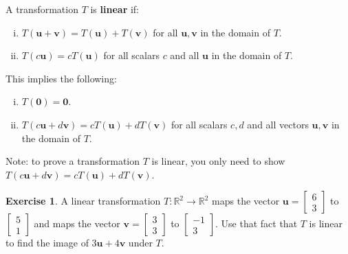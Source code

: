 \documentclass[10pt]{book}
\newcommand{\boxcolor}{gray!30}
\newenvironment{boxme}{\begin{mdframed}[backgroundcolor=\boxcolor,linewidth=0pt,nobreak=true]}{\end{mdframed}}
\theoremstyle{definition}
\newtheorem{exercise}{Exercise}[section]
\newcommand{\R}{\mathbb{R}}
\newcommand{\vect}[1]{\ensuremath{\boldsymbol{\mathbf{#1}}}}
\begin{document}
\newpage


\begin{boxme}
	A transformation $T$ is \textbf{linear} if:
	\begin{enumerate}[(i)]\itemsep=0pt
		\item $T(\vect{u}+\vect{v}) = T(\vect{u})+T(\vect{v})$ for all $\vect{u},\vect{v}$ in the domain of $T$.
		\item $T(c\vect{u}) = cT(\vect{u})$ for all scalars $c$ and all $\vect{u}$ in the domain of $T$.
	\end{enumerate}
	This implies the following:
	\begin{enumerate}[(i)]\itemsep=0pt
		\item $T(\vect{0})=\vect{0}.$
		\item $T(c\vect{u}+d\vect{v}) = cT(\vect{u})+dT(\vect{v})$ for all scalars $c,d$ and all vectors  $\vect{u},\vect{v}$ in the domain of $T$.
	\end{enumerate}
	Note: to prove a transformation $T$ is linear, you only need to show $T(c\vect{u}+d\vect{v}) = cT(\vect{u})+dT(\vect{v})$.
\end{boxme}

\begin{exercise} %
	A linear transformation $T:\R^2\to\R^2$ maps the vector $\vect{u}=\begin{bmatrix}6\\3\end{bmatrix}$ to $\begin{bmatrix}5\\1\end{bmatrix}$ and maps the vector $\vect{v}=\begin{bmatrix}3\\3\end{bmatrix}$ to $\begin{bmatrix}-1\\3\end{bmatrix}$. Use that fact that $T$ is linear to find the image of $3\vect{u}+4\vect{v}$ under $T$.
\end{exercise}
\vfill
\end{document}
